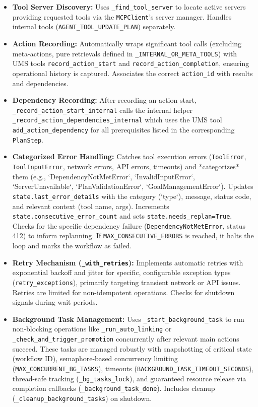 \documentclass[12pt,a4paper]{article}
\newcommand{\code}[1]{\nolinkurl{#1}}
\begin{document}
\begin{itemize}
    \item \textbf{Tool Server Discovery:} Uses \code{\_find\_tool\_server} to locate active servers providing requested tools via the \code{MCPClient}'s server manager. Handles internal tools (\code{AGENT\_TOOL\_UPDATE\_PLAN}) separately.
    \item \textbf{Action Recording:} Automatically wraps significant tool calls (excluding meta-actions, pure retrievals defined in \code{\_INTERNAL\_OR\_META\_TOOLS}) with UMS tools \code{record\_action\_start} and \code{record\_action\_completion}, ensuring operational history is captured. Associates the correct \code{action\_id} with results and dependencies.
    \item \textbf{Dependency Recording:} After recording an action start, \code{\_record\_action\_start\_internal} calls the internal helper \code{\_record\_action\_dependencies\_internal} which uses the UMS tool \code{add\_action\_dependency} for all prerequisites listed in the corresponding \code{PlanStep}.
    \item \textbf{Categorized Error Handling:} Catches tool execution errors (\code{ToolError}, \code{ToolInputError}, network errors, API errors, timeouts) and *categorizes* them (e.g., `DependencyNotMetError`, `InvalidInputError`, `ServerUnavailable`, `PlanValidationError`, `GoalManagementError`). Updates \code{state.last\_error\_details} with the category (`type`), message, status code, and relevant context (tool name, args). Increments \code{state.consecutive\_error\_count} and sets \code{state.needs\_replan=True}. Checks for the specific dependency failure (\code{DependencyNotMetError}, status 412) to inform replanning. If \code{MAX\_CONSECUTIVE\_ERRORS} is reached, it halts the loop and marks the workflow as failed.
    \item \textbf{Retry Mechanism (\code{\_with\_retries}):} Implements automatic retries with exponential backoff and jitter for specific, configurable exception types (\code{retry\_exceptions}), primarily targeting transient network or API issues. Retries are limited for non-idempotent operations. Checks for shutdown signals during wait periods.
    \item \textbf{Background Task Management:} Uses \code{\_start\_background\_task} to run non-blocking operations like \code{\_run\_auto\_linking} or \code{\_check\_and\_trigger\_promotion} concurrently after relevant main actions succeed. These tasks are managed robustly with snapshotting of critical state (workflow ID), semaphore-based concurrency limiting (\code{MAX\_CONCURRENT\_BG\_TASKS}), timeouts (\code{BACKGROUND\_TASK\_TIMEOUT\_SECONDS}), thread-safe tracking (\code{\_bg\_tasks\_lock}), and guaranteed resource release via completion callbacks (\code{\_background\_task\_done}). Includes cleanup (\code{\_cleanup\_background\_tasks}) on shutdown.
\end{itemize}
\end{document}
